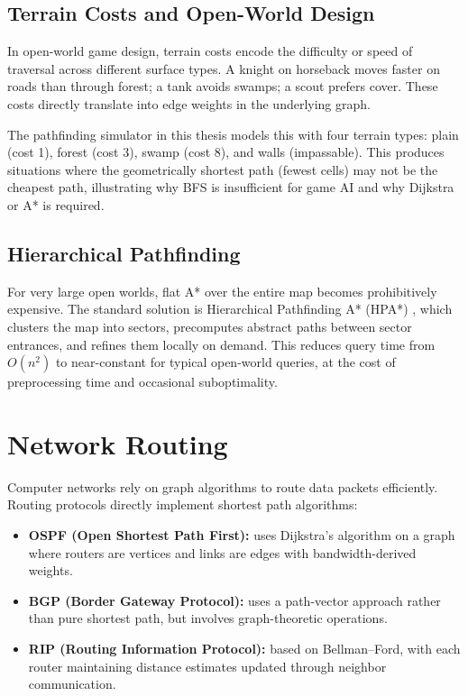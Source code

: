\documentclass[12pt, a4paper, oneside]{report}
\theoremstyle{definition}
\begin{document}
\subsection{Terrain Costs and Open-World Design}

In open-world game design, terrain costs encode the difficulty or speed of traversal across different surface types. A knight on horseback moves faster on roads than through forest; a tank avoids swamps; a scout prefers cover. These costs directly translate into edge weights in the underlying graph.

The pathfinding simulator in this thesis models this with four terrain types: plain (cost 1), forest (cost 3), swamp (cost 8), and walls (impassable). This produces situations where the geometrically shortest path (fewest cells) may not be the cheapest path, illustrating why BFS is insufficient for game AI and why Dijkstra or A* is required.

\subsection{Hierarchical Pathfinding}

For very large open worlds, flat A* over the entire map becomes prohibitively expensive. The standard solution is Hierarchical Pathfinding A* (HPA*) \citep{botea2004}, which clusters the map into sectors, precomputes abstract paths between sector entrances, and refines them locally on demand. This reduces query time from $O(n^2)$ to near-constant for typical open-world queries, at the cost of preprocessing time and occasional suboptimality.

\section{Network Routing}

Computer networks rely on graph algorithms to route data packets efficiently. Routing protocols directly implement shortest path algorithms:

\begin{itemize}
    \item \textbf{OSPF (Open Shortest Path First):} uses Dijkstra's algorithm on a graph where routers are vertices and links are edges with bandwidth-derived weights.
    \item \textbf{BGP (Border Gateway Protocol):} uses a path-vector approach rather than pure shortest path, but involves graph-theoretic operations.
    \item \textbf{RIP (Routing Information Protocol):} based on Bellman–Ford, with each router maintaining distance estimates updated through neighbor communication.
\end{itemize}
\end{document}
